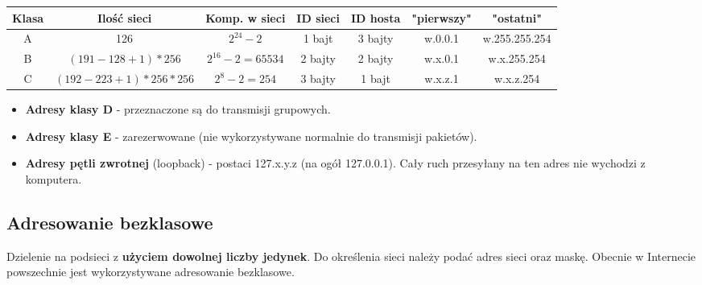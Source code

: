 \documentclass[../main.tex]{subfiles}
\begin{document}
\begin{adjustbox}{width=\columnwidth,center}
    \begin{tabular}{|c|c|c|c|c|c|c|}
        \hline
        Klasa & Ilość sieci & Komp. w sieci & ID sieci & ID hosta & "pierwszy" & "ostatni"\\
        \hline
        A & 126 & $2^{24}-2$ & 1 bajt & 3 bajty & w.0.0.1 & w.255.255.254\\
        \hline
        B & $(191-128+1)*256$ & $2^{16}-2 = 65 534$ & 2 bajty & 2 bajty & w.x.0.1 & w.x.255.254\\
        \hline
        C & $(192-223+1)*256*256$ & $2^8 -2 = 254$ & 3 bajty & 1 bajt & w.x.z.1 & w.x.z.254\\
        \hline
    \end{tabular}
\end{adjustbox}

    \begin{itemize}
        \item \textbf{Adresy klasy D} - przeznaczone są do transmisji grupowych.
        \item \textbf{Adresy klasy E} - zarezerwowane (nie wykorzystywane normalnie do transmisji pakietów).
        \item \textbf{Adresy pętli zwrotnej} (loopback) - postaci 127.x.y.z (na ogół 127.0.0.1). Cały ruch przesyłany na ten adres nie wychodzi z komputera.
    \end{itemize}


    \subsection{Adresowanie bezklasowe}
    Dzielenie na podsieci z \textbf{użyciem dowolnej liczby jedynek}. Do określenia sieci należy podać adres
    sieci oraz maskę. Obecnie w Internecie powszechnie jest wykorzystywane adresowanie
    bezklasowe.
\end{document}

